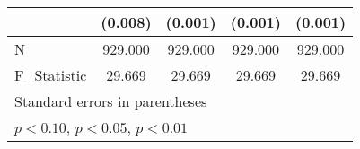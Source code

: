 {\begin{tabular}{l*{4}{c}}
            &     (0.008)         &     (0.001)         &     (0.001)         &     (0.001)         \\
\hline
N           &     929.000         &     929.000         &     929.000         &     929.000         \\
F\_Statistic &      29.669         &      29.669         &      29.669         &      29.669         \\
\hline\hline
\multicolumn{5}{l}{\footnotesize Standard errors in parentheses}\\
\multicolumn{5}{l}{\footnotesize \sym{*} \(p<0.10\), \sym{**} \(p<0.05\), \sym{***} \(p<0.01\)}\\
\end{tabular}
}

